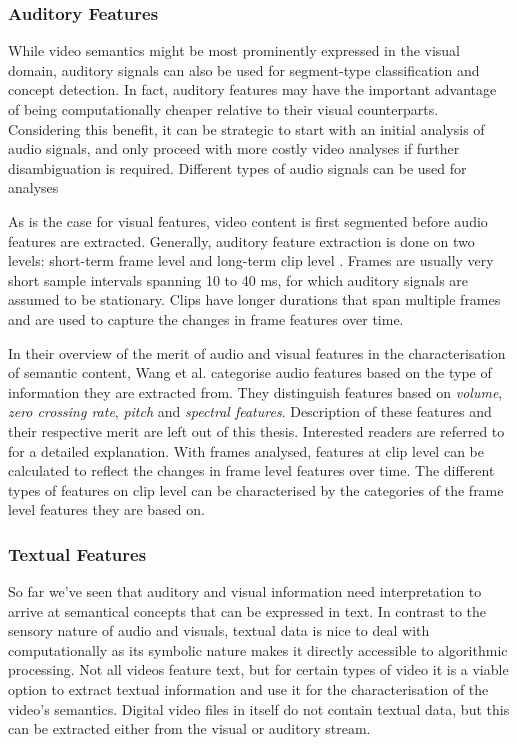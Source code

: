 \begin{itemize}
\end{itemize}

\subsubsection{Auditory Features}

While video semantics might be most prominently expressed in the visual domain, auditory signals can also be used for segment-type classification and concept detection. In fact, auditory features may have the important advantage of being computationally cheaper relative to their visual counterparts. Considering this benefit, it can be strategic to start with an initial analysis of audio signals, and only proceed with more costly video analyses if further disambiguation is required. Different types of audio signals can be used for analyses 

As is the case for visual features, video content is first segmented before audio features are extracted. Generally, auditory feature extraction is done on two levels: short-term frame level and long-term clip level \cite{Wang:2000vf}. Frames are usually very short sample intervals spanning 10 to 40 ms, for which auditory signals are assumed to be stationary. Clips have longer durations that span multiple frames and are used to capture the changes in frame features over time.

In their overview of the merit of audio and visual features in the characterisation of semantic content, Wang et al. categorise audio features based on the type of information they are extracted from. They distinguish features based on \emph{volume}, \emph{zero crossing rate}, \emph{pitch} and \emph{spectral features}. Description of these features and their respective merit are left out of this thesis. Interested readers are referred to \cite{Wang:2000vf} for a detailed explanation. With frames analysed, features at clip level can be calculated to reflect the changes in frame level features over time. The different types of features on clip level can be characterised by the categories of the frame level features they are based on.

\subsubsection{Textual Features}

So far we've seen that auditory and visual information need interpretation to arrive at semantical concepts that can be expressed in text. In contrast to the sensory nature of audio and visuals, textual data is nice to deal with computationally as its symbolic nature makes it directly accessible to algorithmic processing. Not all videos feature text, but for certain types of video it is a viable option to extract textual information and use it for the characterisation of the video's semantics. Digital video files in itself do not contain textual data, but this can be extracted either from the visual or auditory stream.

